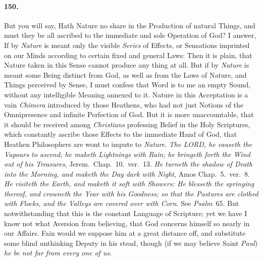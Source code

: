 \documentclass[]{article}
\newenvironment{sectionbody}{}{}
\begin{document}
\begin{sectionbody}
\paragraph{150.} But you will say, Hath Nature no share in the Production of
natural Things, and must they be all ascribed to the immediate
and sole Operation of {\sc God}? I answer, If by \emph{Nature}
is meant only the visible \emph{Series} of Effects, or
Sensations imprinted on our Minds according to certain fixed and
general Laws: Then it is plain, that Nature taken in this Sense
cannot produce any thing at all.  But if by \emph{Nature} is
meant some Being distinct from {\sc God}, as well as from the
Laws of Nature, and Things perceived by Sense, I must confess
that Word is to me an empty Sound, without any intelligible
Meaning annexed to it.  Nature in this Acceptation is a vain
\emph{Chimera} introduced by those Heathens, who had not just
Notions of the Omnipresence and infinite Perfection of {\sc God}.
But it is more unaccountable, that it should be received among
\emph{Christians} professing Belief in the Holy Scriptures,
which constantly ascribe those Effects to the immediate Hand of
{\sc God}, that Heathen Philosophers are wont to impute to
\emph{Nature}.  \emph{The LORD, he causeth the Vapours to ascend;
he maketh Lightnings with Rain; he bringeth forth the Wind out of
his Treasures}, Jerem.\ Chap.~10.\ ver.~13.  \emph{He turneth the
shadow of Death into the Morning, and maketh the Day dark with
Night}, Amos Chap.~5.\ ver.~8.  \emph{He visiteth the Earth, and
maketh it soft with Showers: He blesseth the springing thereof,
and crowneth the Year with his Goodness; so that the Pastures are
clothed with Flocks, and the Valleys are covered over with Corn}.
See \emph{Psalm}~65.  But notwithstanding that this is the
constant Language of Scripture; yet we have I know not what
Aversion from believing, that {\sc God} concerns himself so
nearly in our Affairs.  Fain would we suppose him at a great
distance off, and substitute some blind unthinking Deputy in his
stead, though (if we may believe Saint \emph{Paul}) \emph{he be
not far from every one of us}.




\end{sectionbody}
\end{document}
